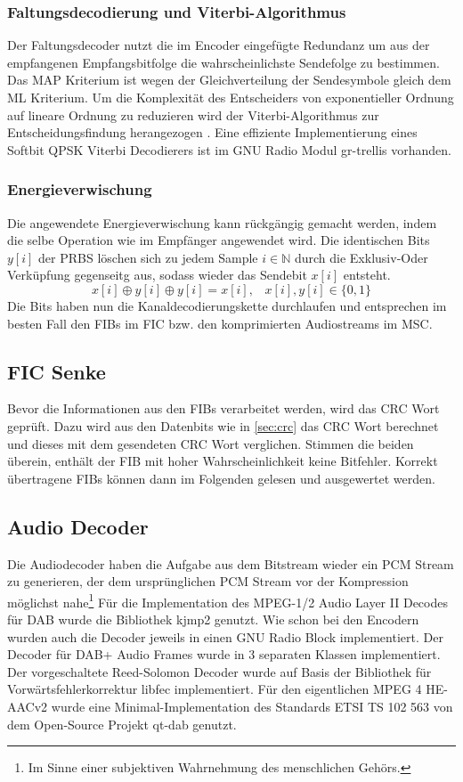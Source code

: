 \subsubsection{Faltungsdecodierung und Viterbi-Algorithmus}
Der Faltungsdecoder nutzt die im Encoder eingefügte Redundanz um aus der empfangenen Empfangsbitfolge die wahrscheinlichste Sendefolge zu bestimmen. Das \ac{MAP} Kriterium ist wegen der Gleichverteilung der Sendesymbole gleich dem \ac{ML} Kriterium. Um die Komplexität des Entscheiders von exponentieller Ordnung auf lineare Ordnung zu reduzieren wird der Viterbi-Algorithmus zur Entscheidungsfindung herangezogen \cite{nt1}. Eine effiziente Implementierung eines Softbit QPSK Viterbi Decodierers ist im GNU Radio Modul gr-trellis vorhanden.

\subsubsection{Energieverwischung}
Die angewendete Energieverwischung kann rückgängig gemacht werden, indem die selbe Operation wie im Empfänger angewendet wird. Die identischen Bits $y[i]$ der \ac{PRBS} löschen sich zu jedem Sample $i \in \mathbb{N}$ durch die Exklusiv-Oder Verküpfung gegenseitg aus, sodass wieder das Sendebit $x[i]$ entsteht.
\begin{equation}
    x[i] \oplus y[i] \oplus y[i] = x[i], \; \; \; x[i],y[i] \in \{0,1\}
\end{equation}
Die Bits haben nun die Kanaldecodierungskette durchlaufen und entsprechen im besten Fall den FIBs im FIC bzw. den komprimierten Audiostreams im MSC.

\subsection{FIC Senke}
Bevor die Informationen aus den FIBs verarbeitet werden, wird das CRC Wort geprüft. Dazu wird aus den Datenbits wie in \ref{sec:crc} das CRC Wort berechnet und dieses mit dem gesendeten CRC Wort verglichen. Stimmen die beiden überein, enthält der FIB mit hoher Wahrscheinlichkeit keine Bitfehler. Korrekt übertragene FIBs können dann im Folgenden gelesen und ausgewertet werden.

\subsection{Audio Decoder}
Die Audiodecoder haben die Aufgabe aus dem Bitstream wieder ein PCM Stream zu generieren, der dem ursprünglichen PCM Stream vor der Kompression möglichst nahe\footnote{Im Sinne einer subjektiven Wahrnehmung des menschlichen Gehörs.}
Für die Implementation des MPEG-1/2 Audio Layer II Decodes für DAB wurde die Bibliothek kjmp2 genutzt. Wie schon bei den Encodern wurden auch die Decoder jeweils in einen GNU Radio Block implementiert. Der Decoder für DAB+ Audio Frames wurde in 3 separaten Klassen implementiert. Der vorgeschaltete Reed-Solomon Decoder wurde auf Basis der Bibliothek für Vorwärtsfehlerkorrektur libfec implementiert. Für den eigentlichen MPEG 4 HE-AACv2 wurde eine Minimal-Implementation des Standards ETSI TS 102 563  von dem Open-Source Projekt qt-dab genutzt.